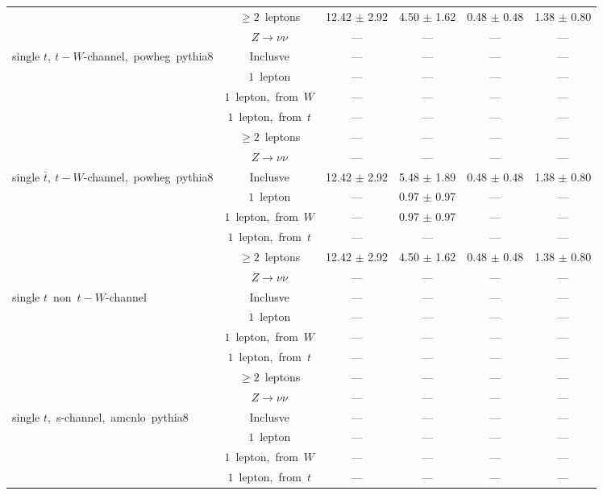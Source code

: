 \documentclass{article}
\begin{document}
\begin{longtable}{|l|c|c|c|c|c|}
 & $\ge2$~leptons  & 12.42 $\pm$ 2.92  & 4.50 $\pm$ 1.62  & 0.48 $\pm$ 0.48  & 1.38 $\pm$ 0.80 \\* 
 & $Z\rightarrow\nu\nu$  & ---  & ---  & ---  & --- \\* 
\hline 
\multirow{6}{*}{single $t,~t-W$-channel,~powheg~pythia8} & Inclusve  & ---  & ---  & ---  & --- \\* 
 & $1$~lepton  & ---  & ---  & ---  & --- \\* 
 & $1$~lepton,~from~$W$  & ---  & ---  & ---  & --- \\* 
 & $1$~lepton,~from~$t$  & ---  & ---  & ---  & --- \\* 
 & $\ge2$~leptons  & ---  & ---  & ---  & --- \\* 
 & $Z\rightarrow\nu\nu$  & ---  & ---  & ---  & --- \\* 
\hline 
\multirow{6}{*}{single $\bar{t},~t-W$-channel,~powheg~pythia8} & Inclusve  & 12.42 $\pm$ 2.92  & 5.48 $\pm$ 1.89  & 0.48 $\pm$ 0.48  & 1.38 $\pm$ 0.80 \\* 
 & $1$~lepton  & ---  & 0.97 $\pm$ 0.97  & ---  & --- \\* 
 & $1$~lepton,~from~$W$  & ---  & 0.97 $\pm$ 0.97  & ---  & --- \\* 
 & $1$~lepton,~from~$t$  & ---  & ---  & ---  & --- \\* 
 & $\ge2$~leptons  & 12.42 $\pm$ 2.92  & 4.50 $\pm$ 1.62  & 0.48 $\pm$ 0.48  & 1.38 $\pm$ 0.80 \\* 
 & $Z\rightarrow\nu\nu$  & ---  & ---  & ---  & --- \\* 
\hline 
\multirow{6}{*}{single $t$~non~$t-W$-channel} & Inclusve  & ---  & ---  & ---  & --- \\* 
 & $1$~lepton  & ---  & ---  & ---  & --- \\* 
 & $1$~lepton,~from~$W$  & ---  & ---  & ---  & --- \\* 
 & $1$~lepton,~from~$t$  & ---  & ---  & ---  & --- \\* 
 & $\ge2$~leptons  & ---  & ---  & ---  & --- \\* 
 & $Z\rightarrow\nu\nu$  & ---  & ---  & ---  & --- \\* 
\hline 
\multirow{6}{*}{single $t$,~s-channel,~amcnlo~pythia8} & Inclusve  & ---  & ---  & ---  & --- \\* 
 & $1$~lepton  & ---  & ---  & ---  & --- \\* 
 & $1$~lepton,~from~$W$  & ---  & ---  & ---  & --- \\* 
 & $1$~lepton,~from~$t$  & ---  & ---  & ---  & --- \\* 

\end{longtable}
\end{document}
